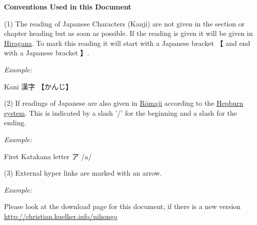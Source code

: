 \bigskip

\textbf{Conventions Used in this Document}

\bigskip

(1) The reading of Japanese Characters (Kanji) are not given in the section or
chapter heading but as soon as possible. If the reading is given it will be
given in \hyperref[sec:Hiragana]{Hiragana}. To mark this reading it will start
with a Japanese bracket {【} and end with a Japanese bracket {】}.

\bigskip
\textit{Example:}

\bigskip
\begin{center}
     Kani {漢字} {【かんじ】}
\end{center}

\bigskip

(2) If readings of Japanese are also given in \hyperref[sec:Romaji]{Rōmaji}
according to the \hyperref[sec:Hepburn]{Hepburn system}. This is indicated by a
slash '/' for the beginning and a slash for the ending.

\bigskip
\textit{Example:}

\bigskip
\begin{center}
     First Katakana letter {ア} {/a/}
\end{center}

\bigskip

(3) External hyper links are marked with an arrow.

\bigskip
\textit{Example:}

\bigskip
\begin{center}
     Please look at the download page for this document, if there is a new
     version\\ \Link
     \href{http://christian.kuelker.info/nihongo}{http://christian.kuelker.info/nihongo}
\end{center}

